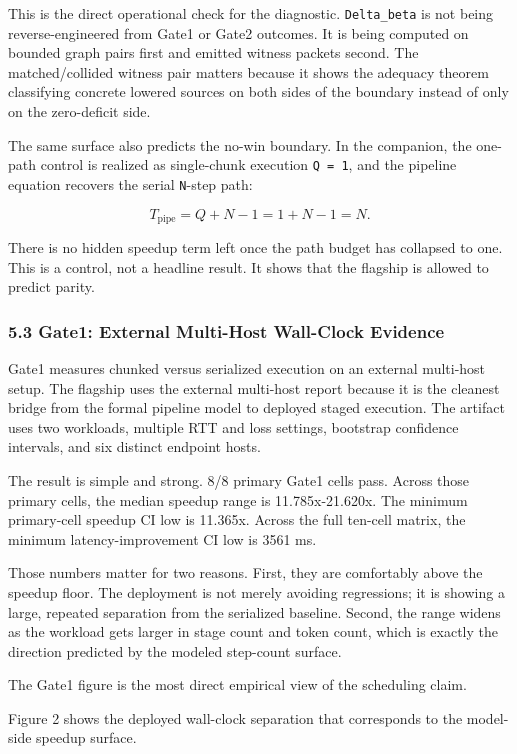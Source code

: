 \documentclass[
  11pt,
]{article}
\begin{document}
This is the direct operational check for the diagnostic.
\texttt{Delta\_beta} is not being reverse-engineered from Gate1 or Gate2
outcomes. It is being computed on bounded graph pairs first and emitted
witness packets second. The matched/collided witness pair matters
because it shows the adequacy theorem classifying concrete lowered
sources on both sides of the boundary instead of only on the
zero-deficit side.

The same surface also predicts the no-win boundary. In the companion,
the one-path control is realized as single-chunk execution
\texttt{Q\ =\ 1}, and the pipeline equation recovers the serial
\texttt{N}-step path:

\[
T_{\mathrm{pipe}} = Q + N - 1 = 1 + N - 1 = N.
\]

There is no hidden speedup term left once the path budget has collapsed
to one. This is a control, not a headline result. It shows that the
flagship is allowed to predict parity.

\subsubsection{5.3 Gate1: External Multi-Host Wall-Clock
Evidence}\label{gate1-external-multi-host-wall-clock-evidence}

Gate1 measures chunked versus serialized execution on an external
multi-host setup. The flagship uses the external multi-host report
because it is the cleanest bridge from the formal pipeline model to
deployed staged execution. The artifact uses two workloads, multiple RTT
and loss settings, bootstrap confidence intervals, and six distinct
endpoint hosts.

The result is simple and strong. 8/8 primary Gate1 cells pass. Across
those primary cells, the median speedup range is 11.785x-21.620x. The
minimum primary-cell speedup CI low is 11.365x. Across the full ten-cell
matrix, the minimum latency-improvement CI low is 3561 ms.

Those numbers matter for two reasons. First, they are comfortably above
the speedup floor. The deployment is not merely avoiding regressions; it
is showing a large, repeated separation from the serialized baseline.
Second, the range widens as the workload gets larger in stage count and
token count, which is exactly the direction predicted by the modeled
step-count surface.

The Gate1 figure is the most direct empirical view of the scheduling
claim.

Figure 2 shows the deployed wall-clock separation that corresponds to
the model-side speedup surface.
\end{document}
